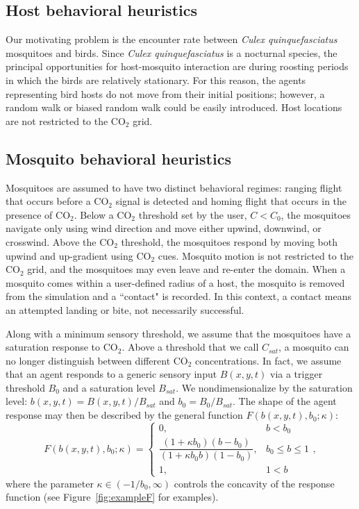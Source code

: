 \documentclass[12pt]{article}
\def\cq{{\emph{Culex quinquefasciatus} }}
\begin{document}
	\subsection{Host behavioral heuristics}
	Our motivating problem is the encounter rate between \cq mosquitoes and birds. Since \cq is a nocturnal species, the principal opportunities for host-mosquito interaction are during roosting periods in which the birds are relatively stationary. For this reason, the agents representing bird hosts do not move from their initial positions; however, a random walk or biased random walk could be easily introduced. Host locations are not restricted to the CO$_2$ grid.

	\subsection{Mosquito behavioral heuristics}\label{sec:rules}
	Mosquitoes are assumed to have two distinct behavioral regimes: ranging flight that occurs before a CO$_2$ signal is detected and homing flight that occurs in the presence of CO$_2$. Below a CO$_2$ threshold set by the user, $C < C_0$, the mosquitoes navigate only using wind direction and move either upwind, downwind, or crosswind. Above the CO$_2$ threshold, the mosquitoes respond by moving both upwind and up-gradient using CO$_2$ cues. Mosquito motion is not restricted to the CO$_2$ grid, and the mosquitoes may even leave and re-enter the domain. When a mosquito comes within a user-defined radius of a host, the mosquito is removed from the simulation and a ``contact" is recorded. In this context, a contact means an attempted landing or bite, not necessarily successful. 
	
	Along with a minimum sensory threshold, we assume that the mosquitoes have a saturation response to CO$_2$. Above a threshold that we call $C_{sat}$, a mosquito can no longer distinguish between different CO$_2$ concentrations. In fact, we assume that an agent responds to a generic sensory input $B(x,y,t)$ via a trigger threshold $B_0$ and a saturation level $B_{sat}$. We nondimensionalize by the saturation level: $b(x,y,t)=B(x,y,t)/B_{sat}$ and $b_0 = B_0/B_{sat}$. The shape of the agent response may then be described by the general function $F(b(x,y,t), b_0; \kappa)$:
	\begin{equation}
		F(b(x,y,t), b_0; \kappa) = \left\{ \begin{array}{lr} 0, & b < b_0 \\ \dfrac{(1+\kappa b_0)(b-b_0)}{(1+\kappa b_0 b)(1 - b_0)}, & b_0 \leq b \leq 1 \\ 1, & 1 < b  \end{array}\right. , \label{eqn:functional}
	\end{equation}
where the parameter $\kappa \in (-1/b_0,\infty)$ controls the concavity of the response function (see Figure~\ref{fig:exampleF} for examples). 
\end{document}
